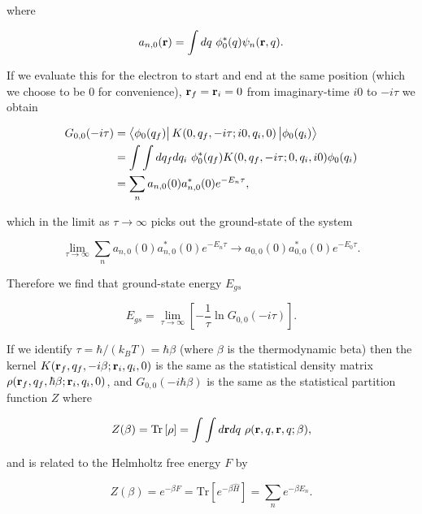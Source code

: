 where

\begin{equation}
    a_{n,0}(\vb{r}) = \int dq\ \phi^*_0(q) 
    \psi_n(\vb{r}, q).
\end{equation}

If we evaluate this for the electron to start and end at the same position (which we choose to be $0$ for convenience), $\vb{r}_f = \vb{r}_i = 0$ from imaginary-time $i0$ to $-i\tau$ we obtain

\begin{equation}
    \begin{aligned}
    G_{0,0}(-i\tau) &= \bra{\phi_0(q_f)} K(0, q_f, -i\tau; i0, q_i, 0) \ket{\phi_0(q_i)} \\
    &= \int\int dq_f dq_i\ \phi_0^*(q_f) K(0, q_f, -i\tau; 0, q_i, i0) \phi_0(q_i) \\
    &= \sum_n a_{n,0}(0) a^*_{n,0}(0) e^{-E_n \tau},
    \end{aligned}
\end{equation}

which in the limit as $\tau \to \infty$ picks out the ground-state of the system

\begin{equation}
    \lim_{\tau \to \infty} \sum_n a_{n,0}(0) a^*_{n,0}(0) e^{-E_n \tau} \rightarrow a_{0,0}(0) a^*_{0,0}(0) e^{-E_0 \tau}.
\end{equation}

Therefore we find that ground-state energy $E_{gs}$

\begin{equation}
    E_{gs} = \lim_{\tau \to \infty} \left[-\frac{1}{\tau} \ln G_{0,0}(-i\tau) \right].
\end{equation}

If we identify $\tau = \hbar /(k_B T) = \hbar\beta$ (where $\beta$ is the thermodynamic beta) then the kernel $K(\vb{r}_{f}, q_f, -i\beta; \vb{r}_{i}, q_i, 0)$ is the same as the statistical density matrix $\rho(\vb{r}_{f}, q_f, \hbar\beta; \vb{r}_{i}, q_i, 0)$, and $G_{0,0}(-i\hbar\beta)$ is the same as the statistical partition function $Z$ where

\begin{equation}
    Z(\beta) = \textrm{Tr} \left[\rho\right] = \int \int d\vb{r} dq\ \rho(\vb{r}, q, \vb{r}, q; \beta),
\end{equation}

and is related to the Helmholtz free energy $F$ by

\begin{equation}
    Z(\beta) = e^{-\beta F} = \textrm{Tr}\left[ e^{-\beta \hat{H}}\right] = \sum_n e^{-\beta E_n}.
\end{equation}

